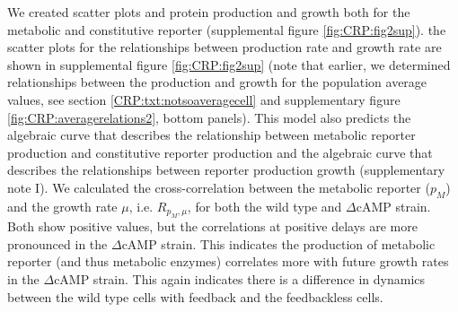 








We created scatter plots and  protein production and growth  
both for the metabolic and constitutive reporter (supplemental figure \ref{fig:CRP:fig2sup}).
%
the scatter plots for the relationships between production rate and growth rate are shown in supplemental figure \ref{fig:CRP:fig2sup}
(note that earlier, we determined relationships between the production and growth for the population average values, see section \ref{CRP:txt:notsoaveragecell} and supplementary figure \ref{fig:CRP:averagerelations2}, bottom panels).
%
This model also predicts the algebraic curve that describes the relationship between metabolic reporter production and constitutive reporter production 
and the algebraic curve that describes the relationships between reporter production growth (supplementary note I).
%
%
%
%
%
We calculated the cross-correlation between the metabolic reporter ($p_M$) and the growth rate $\mu$,
i.e. $R_{p_M,\mu}$,
for both the wild type and $\Delta$cAMP strain.
%
%
Both show positive values, 
but the correlations at positive delays are more pronounced in the $\Delta$cAMP strain.
%
%
%
This indicates the production of metabolic reporter (and thus metabolic enzymes)
correlates more with future growth rates in the $\Delta$cAMP strain.
%
This again indicates there is a difference in dynamics between the wild type cells with feedback and the feedbackless cells.



















